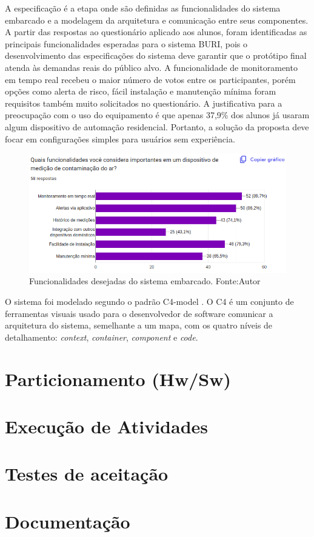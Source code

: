 A especificação é a etapa onde são definidas as funcionalidades do sistema embarcado e a modelagem da arquitetura e comunicação entre 
seus componentes. A partir das respostas ao questionário aplicado aos alunos, foram identificadas as principais funcionalidades esperadas 
para o sistema BURI, pois o desenvolvimento das especificações do sistema deve garantir que o protótipo final atenda às demandas reais do
público alvo. A funcionalidade de monitoramento em tempo real recebeu o maior número de votos entre os participantes, porém opções como alerta de risco, fácil instalação e 
manutenção mínima foram requisitos também muito solicitados no questionário. A justificativa para a preocupação com o uso do equipamento é que apenas 37,9\% dos alunos já usaram 
algum dispositivo de automação residencial. Portanto, a solução da proposta deve focar em configurações simples para usuários sem experiência.
\begin{figure}[ht]
    \centering
    \includegraphics[width=.77\textwidth]{img/graf1-funcionalidades.png}
    \caption{Funcionalidades desejadas do sistema embarcado. Fonte:Autor}\label{figFuncionalidades}
\end{figure}

O sistema foi modelado segundo o padrão C4-model \cite{c4-model}. O C4 é um conjunto de ferramentas visuais usado para 
o desenvolvedor de software comunicar a arquitetura do sistema, semelhante a um mapa, com os quatro níveis de detalhamento: \textit{context}, 
\textit{container}, \textit{component} e \textit{code}. 

\section{Particionamento (Hw/Sw)}\label{fase3}

\section{Execução de Atividades}\label{fase4}

\section{Testes de aceitação}\label{fase5}

\section{Documentação}\label{fase6}